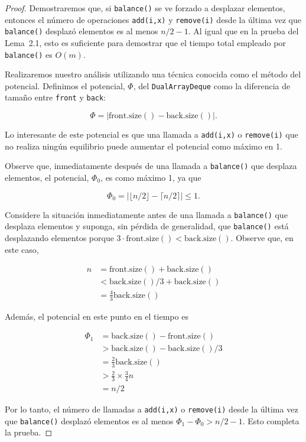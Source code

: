 \documentclass[11pt]{book}
\theoremstyle{plain}
\begin{document}
\begin{proof}
Demostraremos que, si \texttt{balance()} se ve forzado a desplazar elementos, entonces el número de operaciones \texttt{add(i,x)} y \texttt{remove(i)} desde la última vez que \texttt{balance()} desplazó elementos es al menos $n/2 - 1$. Al igual que en la prueba del Lema~2.1, esto es suficiente para demostrar que el tiempo total empleado por \texttt{balance()} es $O(m)$.

Realizaremos nuestro análisis utilizando una técnica conocida como el método del potencial. Definimos el potencial, $\Phi$, del \texttt{DualArrayDeque} como la diferencia de tamaño entre \texttt{front} y \texttt{back}:

$$
\Phi = |\text{front.size}() - \text{back.size}()| .
$$

Lo interesante de este potencial es que una llamada a \texttt{add(i,x)} o \texttt{remove(i)} que no realiza ningún equilibrio puede aumentar el potencial como máximo en 1.

Observe que, inmediatamente después de una llamada a \texttt{balance()} que desplaza elementos, el potencial, $\Phi_0$, es como máximo 1, ya que

$$
\Phi_0 = |\lfloor n/2 \rfloor - \lceil n/2 \rceil| \le 1 .
$$

Considere la situación inmediatamente antes de una llamada a \texttt{balance()} que desplaza elementos y suponga, sin pérdida de generalidad, que \texttt{balance()} está desplazando elementos porque $3 \cdot \text{front.size}() < \text{back.size}()$. Observe que, en este caso,

$$
\begin{aligned}
n &= \text{front.size}() + \text{back.size}() \\
&< \text{back.size}()/3 + \text{back.size}() \\
&= \frac{4}{3} \text{back.size}()
\end{aligned}
$$

Además, el potencial en este punto en el tiempo es

$$
\begin{aligned}
\Phi_1 &= \text{back.size}() - \text{front.size}() \\
&> \text{back.size}() - \text{back.size}()/3 \\
&= \frac{2}{3} \text{back.size}() \\
&> \frac{2}{3} \times \frac{3}{4} n \\
&= n/2
\end{aligned}
$$

Por lo tanto, el número de llamadas a \texttt{add(i,x)} o \texttt{remove(i)} desde la última vez que \texttt{balance()} desplazó elementos es al menos $\Phi_1 - \Phi_0 > n/2 - 1$. Esto completa la prueba.
\end{proof}
\end{document}
